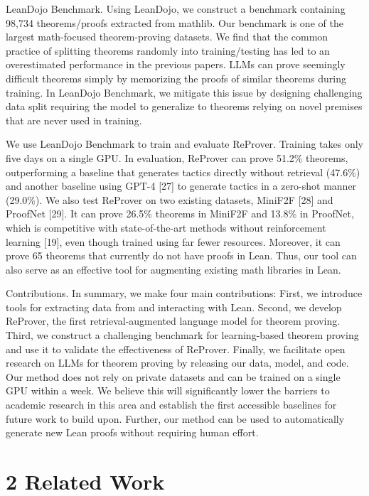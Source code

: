 \documentclass[
]{article}
\begin{document}
LeanDojo Benchmark. Using LeanDojo, we construct a benchmark containing
98,734 theorems/proofs extracted from mathlib. Our benchmark is one of
the largest math-focused theorem-proving datasets. We find that the
common practice of splitting theorems randomly into training/testing has
led to an overestimated performance in the previous papers. LLMs can
prove seemingly difficult theorems simply by memorizing the proofs of
similar theorems during training. In LeanDojo Benchmark, we mitigate
this issue by designing challenging data split requiring the model to
generalize to theorems relying on novel premises that are never used in
training.

We use LeanDojo Benchmark to train and evaluate ReProver. Training takes
only five days on a single GPU. In evaluation, ReProver can prove 51.2\%
theorems, outperforming a baseline that generates tactics directly
without retrieval (47.6\%) and another baseline using GPT-4 {[}27{]} to
generate tactics in a zero-shot manner (29.0\%). We also test ReProver
on two existing datasets, MiniF2F {[}28{]} and ProofNet {[}29{]}. It can
prove 26.5\% theorems in MiniF2F and 13.8\% in ProofNet, which is
competitive with state-of-the-art methods without reinforcement learning
{[}19{]}, even though trained using far fewer resources. Moreover, it
can prove 65 theorems that currently do not have proofs in Lean. Thus,
our tool can also serve as an effective tool for augmenting existing
math libraries in Lean.

Contributions. In summary, we make four main contributions: First, we
introduce tools for extracting data from and interacting with Lean.
Second, we develop ReProver, the first retrieval-augmented language
model for theorem proving. Third, we construct a challenging benchmark
for learning-based theorem proving and use it to validate the
effectiveness of ReProver. Finally, we facilitate open research on LLMs
for theorem proving by releasing our data, model, and code. Our method
does not rely on private datasets and can be trained on a single GPU
within a week. We believe this will significantly lower the barriers to
academic research in this area and establish the first accessible
baselines for future work to build upon. Further, our method can be used
to automatically generate new Lean proofs without requiring human
effort.

\section{2 Related Work}\label{related-work}
\end{document}
